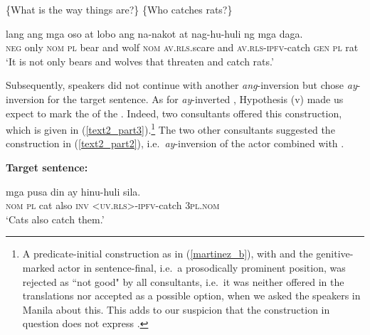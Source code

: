 \documentclass[output=paper,
,modfonts
,nonflat]{langsci/langscibook}
\begin{document}
\begin{exe}
\ex\label{text2_part1}
\begin{xlist}
 \{What is the way things are?\}
 \{Who catches rats?\}
\end{xlist}
\begin{xlist}[{>}> A\textsubscript{{0.1'}}:]
 lang {{\ob}ang} mga oso at {lobo{\cb}\focus} ang na-nakot    at nag-hu-huli {{\ob}ng} mga {daga{\cb}\topic{\cb}\sq}.\\
\textsc{\void{[}neg} only \textsc{\void{[}nom} \textsc{pl} bear and wolf \textsc{nom} \textsc{av.rls}.scare and \textsc{av.rls-ipfv}-catch \textsc{\void{[}gen} \textsc{pl} rat\\    
\glt `It is not only bears and wolves that threaten and catch rats.'
\end{xlist}
\end{exe}
 
\noindent Subsequently, speakers did not continue with another \textit{ang}-inversion but chose \textit{ay}-inver\-sion for the target sentence. As for \textit{ay}-inverted , Hypothesis (v) made us expect  to mark the 
 of the . Indeed, two consultants offered this construction, which is given in (\ref{text2_part3}).\footnote{A predicate-initial construction as in (\ref{martinez_b}), with  and the genitive-marked actor in sentence-final, i.e.\ a prosodically prominent position, was rejected as ``not good" by all consultants, i.e.\ it was neither offered in the translations nor accepted as a possible option, when we asked the speakers in Manila about this. This adds to our suspicion that the construction in question does not express .} The two other consultants suggested the construction in (\ref{text2_part2}), i.e.\ \textit{ay}-inversion of the actor combined with . 

\begin{exe}
\ex\label{text2_part3}\textbf{Target sentence:}
\begin{xlist}[{>}> A\textsubscript{{0.1''}}:]
 mga {pusa{\cb}\focus} din ay h{\USSmaller}in{\USGreater}u-huli {{\ob}sila{\cb}\topic{\cb}\sq}.\\
\textsc{\void{[[}nom} \textsc{pl} cat also \textsc{inv} \textsc{<uv.rls>-ipfv}-catch \textsc{\void{[}3pl.nom}\\ 
\glt `Cats also catch them.'
\end{xlist}
\end{exe}
\end{document}
